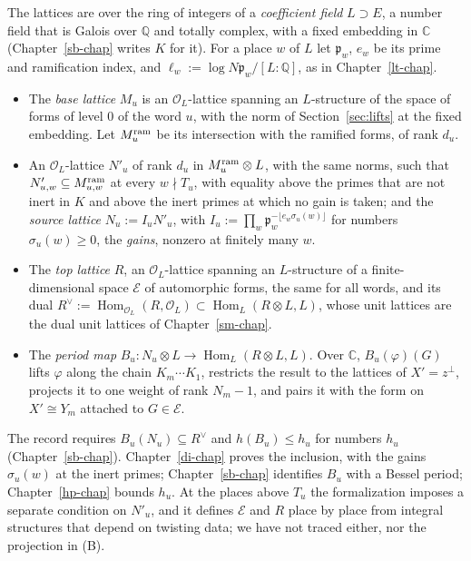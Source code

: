 \documentclass[reqno]{amsart}
\newcounter{chap}
\theoremstyle{definition}
\theoremstyle{plain}
\theoremstyle{remark}
\newcommand{\Q}{\mathbb Q}
\newcommand{\C}{\mathbb C}
\newcommand{\Oc}{\mathcal O}
\newcommand{\Ec}{\mathcal E}
\newcommand{\pp}{\mathfrak p}
\newcommand{\Hom}{\operatorname{Hom}}
\begin{document}
The lattices are over the ring of integers of a \emph{coefficient field} \(L\supset E\), a number field that is Galois over \(\Q\) and totally complex, with a fixed embedding in \(\C\) (Chapter~\ref{sb-chap} writes \(K\) for it).  For a place \(w\) of \(L\) let \(\pp_w\), \(e_w\) be its prime and ramification index, and \(\ell_w:=\log N\pp_w/[L:\Q]\), as in Chapter~\ref{lt-chap}.
\begin{itemize}
\item[(M)] The \emph{base lattice} \(M_u\) is an \(\Oc_L\)-lattice spanning an \(L\)-structure of the space of forms of level \(0\) of the word \(u\), with the norm of Section~\ref{sec:lifts} at the fixed embedding.  Let \(M_u^{\rm ram}\) be its intersection with the ramified forms, of rank \(d_u\).
\item[(N)] An \(\Oc_L\)-lattice \(N'_u\) of rank \(d_u\) in \(M_u^{\rm ram}\otimes L\), with the same norms, such that \(N'_{u,w}\subseteq M^{\rm ram}_{u,w}\) at every \(w\nmid T_u\), with equality above the primes that are not inert in \(K\) and above the inert primes at which no gain is taken; and the \emph{source lattice} \(N_u:=I_uN'_u\), with \(I_u:=\prod_w\pp_w^{-\lfloor e_w\sigma_u(w)\rfloor}\) for numbers \(\sigma_u(w)\ge0\), the \emph{gains}, nonzero at finitely many \(w\).
\item[(R)] The \emph{top lattice} \(R\), an \(\Oc_L\)-lattice spanning an \(L\)-structure of a finite-dimensional space \(\Ec\) of automorphic forms, the same for all words, and its dual \(R^\vee:=\Hom_{\Oc_L}(R,\Oc_L)\subset\Hom_L(R\otimes L,L)\), whose unit lattices are the dual unit lattices of Chapter~\ref{sm-chap}.
\item[(B)] The \emph{period map} \(B_u\colon N_u\otimes L\to\Hom_L(R\otimes L,L)\).  Over \(\C\), \(B_u(\varphi)(G)\) lifts \(\varphi\) along the chain \(K_m\cdots K_1\), restricts the result to the lattices of \(X'=z^\perp\), projects it to one weight of rank \(N_m-1\), and pairs it with the form on \(X'\cong Y_m\) attached to \(G\in\Ec\).
\end{itemize}
The record requires \(B_u(N_u)\subseteq R^\vee\) and \(h(B_u)\le h_u\) for numbers \(h_u\) (Chapter~\ref{sb-chap}).  Chapter~\ref{di-chap} proves the inclusion, with the gains \(\sigma_u(w)\) at the inert primes; Chapter~\ref{sb-chap} identifies \(B_u\) with a Bessel period; Chapter~\ref{hp-chap} bounds \(h_u\).  At the places above \(T_u\) the formalization imposes a separate condition on \(N'_u\), and it defines \(\Ec\) and \(R\) place by place from integral structures that depend on twisting data; we have not traced either, nor the projection in (B).
\end{document}

